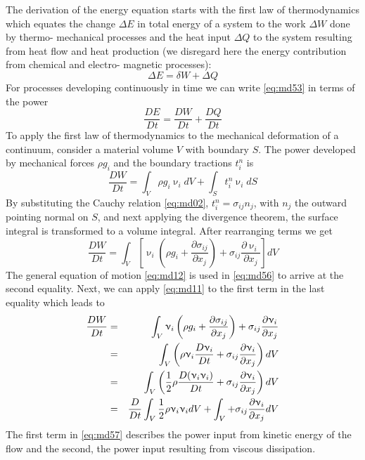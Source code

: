 The derivation of the energy equation starts with the first law of thermodynamics which
equates the change $\Delta E$ in total energy of a system to the work $\Delta W$ done by thermo-
mechanical processes and the heat input $\Delta Q$ to the system resulting from heat flow and
heat production (we disregard here the energy contribution from chemical and electro-
magnetic processes):
\begin{equation}
\Delta E = \delta W + \Delta Q
\label{eq:md53}
\end{equation}
For processes developing continuously in time we can write \eqref{eq:md53} in terms of the power
\begin{equation}
\frac{D E}{Dt} = \frac{D W}{Dt} + \frac{D Q}{Dt}
\label{eq:md54}
\end{equation}
To apply the first law of thermodynamics to the mechanical deformation of a continuum,
consider a material volume $V$ with boundary $S$. The power developed by mechanical
forces $\rho g_i$ and the boundary tractions $t_i^n$ is
\begin{equation}
\frac{DW}{Dt} = \int_V \rho g_i \upnu_i dV + \int_S t_i^n \upnu_i dS
\label{eq:md55}
\end{equation}
By substituting the Cauchy relation \eqref{eq:md02}, $t_i^n = \sigma_{ij}n_j$, 
with $n_j$ the outward pointing normal
on $S$, and next applying the divergence theorem, the surface integral is transformed to a
volume integral. After rearranging terms we get
\begin{equation}
\frac{DW}{Dt} = \int_V 
\left[ \upnu_i ( \rho g_i + \frac{\partial\sigma_{ij}}{\partial x_j}  ) 
+ \sigma_{ij} \frac{\partial \upnu_i }{\partial x_j}
\right] dV
\label{eq:md56}
\end{equation}
The general equation of motion \eqref{eq:md12} is used in \eqref{eq:md56} 
to arrive at the second equality.
Next, we can apply \eqref{eq:md11} to the first term in the last equality which leads to
\begin{eqnarray}
\frac{DW}{Dt} &=& 
\int_V \upnu_i \left( \rho g_i +  \frac{\partial\sigma_{ij}}{\partial x_j}  \right) 
+ \sigma_{ij} \frac{\partial \upnu_i }{\partial x_j} \nonumber\\
&=& \int_V \left(\rho \upnu_i \frac{D\upnu_i}{Dt} 
+ \sigma_{ij}  \frac{\partial \upnu_i }{\partial x_j} \right) dV \\
&=& \int_V \left(\frac12 \rho \frac{D (\upnu_i\upnu_i)}{Dt} 
+ \sigma_{ij}  \frac{\partial \upnu_i }{\partial x_j} \right) dV \\
&=& \frac{D}{Dt} \int_V \frac12 \rho \upnu_i\upnu_i dV + 
\int_V  + \sigma_{ij}  \frac{\partial \upnu_i }{\partial x_j}  dV 
\label{eq:md57}
\end{eqnarray}
The first term in \eqref{eq:md57} 
describes the power input from kinetic energy of the flow and the
second, the power input resulting from viscous dissipation.

